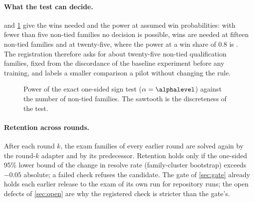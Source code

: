 \paragraph{What the test can decide.}  and \cref{fig:power} give the wins
needed and the power at assumed win probabilities: with fewer than five non-tied families no
decision is possible, \mDesignNOneFiveWins{} wins are needed at fifteen non-tied families
and \mDesignNTwoFiveWins{} at twenty-five, where the power at a win share of 0.8 is
\mDesignNTwoFivePowerEightZero{}. The registration therefore asks for about
twenty-five non-tied qualification families, fixed from the discordance of the baseline
experiment before any training, and labels a smaller comparison a pilot without changing the
rule.

\begin{figure}[t]
\centering
{}
\caption{Power of the exact one-sided sign test ($\alpha=\alphalevel$) against the number of
non-tied families. The sawtooth is the discreteness of the test.}\label{fig:power}
\end{figure}

\paragraph{Retention across rounds.} After each round $k$, the exam families of every earlier
round are solved again by the round-$k$ adapter and by its predecessor. Retention holds only if
the one-sided 95\% lower bound of the change in resolve rate (family-cluster bootstrap) exceeds
$-0.05$ absolute; a failed check refuses the candidate. The gate of
\cref{sec:gate} already holds each earlier release to the exam of its own run for repository
runs; the open defects of \cref{sec:open} are why the registered check is stricter
than the gate's.

